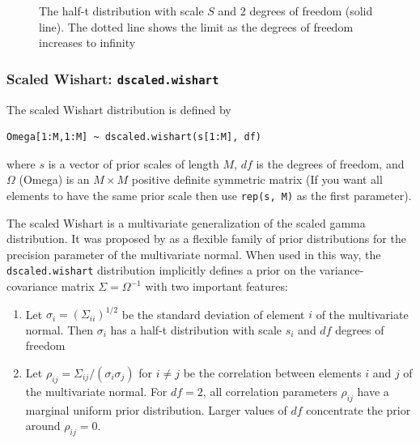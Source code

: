 \documentclass[11pt, a4paper, titlepage]{report}
\begin{document}
\begin{figure}
\caption{The half-t distribution with scale $S$ and 2 degrees of
  freedom (solid line). The dotted line shows the limit as the
  degrees of freedom increases to infinity \label{figure:halft}}
\end{figure}

\subsubsection{Scaled Wishart: \texttt{dscaled.wishart}}

The scaled Wishart distribution is defined by
\begin{verbatim}
Omega[1:M,1:M] ~ dscaled.wishart(s[1:M], df)
\end{verbatim}
where $s$ is a vector of prior scales of length $M$, $df$ is the
degrees of freedom, and $\Omega$ (Omega) is an $M \times M$ positive
definite symmetric matrix (If you want all elements to have the
same prior scale then use \texttt{rep(s, M)} as the first parameter).

The scaled Wishart is a multivariate generalization of the scaled
gamma distribution. It was proposed by \citet{HuangWand2013} as a flexible
family of prior distributions for the precision parameter of the
multivariate normal. When used in this way, the
\texttt{dscaled.wishart} distribution implicitly defines a prior on
the variance-covariance matrix $\Sigma = \Omega^{-1}$ with two
important features:
\begin{enumerate}
\item Let $\sigma_i = (\Sigma_{ii})^{1/2}$ be the standard deviation of
  element $i$ of the multivariate normal. Then $\sigma_i$ has a
  half-t distribution with scale $s_i$ and $df$ degrees of freedom
\item Let $\rho_{ij} = \Sigma_{ij}/(\sigma_i \sigma_j)$ for $i \neq j$
  be the correlation between elements $i$ and $j$ of the multivariate
  normal. For $df=2$, all correlation parameters $\rho_{ij}$ have a
  marginal uniform prior distribution. Larger values of $df$
  concentrate the prior around $\rho_{ij} = 0$.
\end{enumerate}
\end{document}
